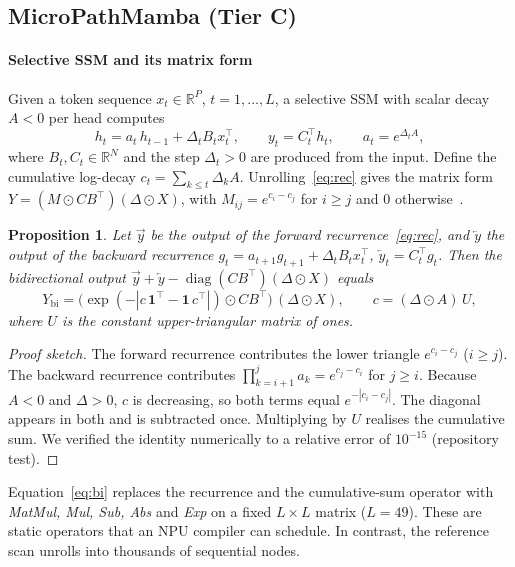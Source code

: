 \documentclass[preprint,12pt]{elsarticle}
\newtheorem{proposition}{Proposition}
\begin{document}
\subsection{MicroPathMamba (Tier C)}
\paragraph{Selective SSM and its matrix form}
Given a token sequence $x_t\in\mathbb{R}^{P}$, $t=1,\dots,L$, a selective SSM with scalar decay $A<0$ per head computes
\begin{equation}
h_t = a_t\,h_{t-1} + \Delta_t B_t x_t^{\top}, \qquad y_t = C_t^{\top} h_t, \qquad a_t = e^{\Delta_t A},
\label{eq:rec}
\end{equation}
where $B_t, C_t\in\mathbb{R}^{N}$ and the step $\Delta_t>0$ are produced from the input. Define the cumulative log-decay $c_t=\sum_{k\le t}\Delta_k A$. Unrolling~\eqref{eq:rec} gives the matrix form $Y=(M\odot CB^{\top})(\Delta\odot X)$, with $M_{ij}=e^{c_i-c_j}$ for $i\ge j$ and $0$ otherwise~\cite{dao2024ssd}.

\begin{proposition}\label{prop:eq}
Let $\overrightarrow{y}$ be the output of the forward recurrence~\eqref{eq:rec}, and $\overleftarrow{y}$ the output of the backward recurrence $g_t=a_{t+1}g_{t+1}+\Delta_tB_tx_t^{\top}$, $\overleftarrow{y}_t=C_t^{\top}g_t$. Then the bidirectional output $\overrightarrow{y}+\overleftarrow{y}-\operatorname{diag}(CB^{\top})(\Delta\odot X)$ equals
\begin{equation}
Y_{\mathrm{bi}} = \big(\exp(-|c\,\mathbf{1}^{\top}-\mathbf{1}\,c^{\top}|)\odot CB^{\top}\big)\,(\Delta\odot X),
\qquad c = (\Delta\odot A)\,U,
\label{eq:bi}
\end{equation}
where $U$ is the constant upper-triangular matrix of ones.
\end{proposition}
\begin{proof}[Proof sketch]
The forward recurrence contributes the lower triangle $e^{c_i-c_j}$ ($i\ge j$). The backward recurrence contributes $\prod_{k=i+1}^{j}a_k=e^{c_j-c_i}$ for $j\ge i$. Because $A<0$ and $\Delta>0$, $c$ is decreasing, so both terms equal $e^{-|c_i-c_j|}$. The diagonal appears in both and is subtracted once. Multiplying by $U$ realises the cumulative sum. We verified the identity numerically to a relative error of $10^{-15}$ (repository test).
\end{proof}

Equation~\eqref{eq:bi} replaces the recurrence and the cumulative-sum operator with \emph{MatMul, Mul, Sub, Abs} and \emph{Exp} on a fixed $L\times L$ matrix ($L=49$). These are static operators that an NPU compiler can schedule. In contrast, the reference scan unrolls into thousands of sequential nodes.
\end{document}
